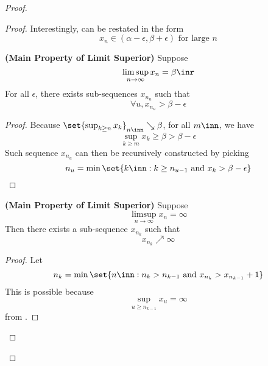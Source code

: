 \documentclass{report}
\begin{document}
\begin{proof}
\begin{proof}
{\begin{minipage}{39em}
Interestingly,  can be restated in the form 
\begin{equation*}
x_n\in (\alpha -\epsilon ,\beta +\epsilon )\text{ for large }n
\end{equation*}
\end{minipage}}
\begin{theorem}
\label{4.4.6}
\textbf{(Main Property of Limit Superior)} Suppose 
\begin{equation*}
\limsup_{n\to\infty} x_n=\beta\inr
\end{equation*}
For all $\epsilon $, there exists sub-sequences $x_{n_u}$ such that 
\begin{equation*}
\forall u,x_{n_u}>\beta - \epsilon 
\end{equation*}
\end{theorem}
\begin{proof}
Because $\set{\sup_{k\geq n}x_k}_{n\inn}\searrow \beta $, for all $m\inn$, we have 
 \begin{equation*}
\sup_{k\geq m} x_k\geq \beta >\beta -\epsilon 
\end{equation*}
Such sequence $x_{n_u}$ can then be recursively constructed by picking 
\begin{equation*}
n_u=\min \set{k\inn:k\geq n_{u-1}\text{ and }x_{k}>\beta -\epsilon }
\end{equation*}
\end{proof}
\begin{theorem}
\label{4.4.7}
\textbf{(Main Property of Limit Superior)} Suppose 
\begin{equation*}
\limsup_{n\to\infty} x_n=\infty
\end{equation*}
Then there exists a sub-sequence $x_{n_k}$ such that 
\begin{equation*}
x_{n_k}\nearrow \infty
\end{equation*}
\end{theorem}
\begin{proof}
Let 
\begin{equation*}
n_k=\min \set{n\inn:n_k>n_{k-1}\text{ and }x_{n_k}>x_{n_{k-1}}+1}
\end{equation*}
This is possible because 
\begin{equation*}
\sup_{u\geq n_{k-1}} x_u=\infty
\end{equation*}
from .
\end{proof}
\end{proof}
\end{proof}
\end{document}

